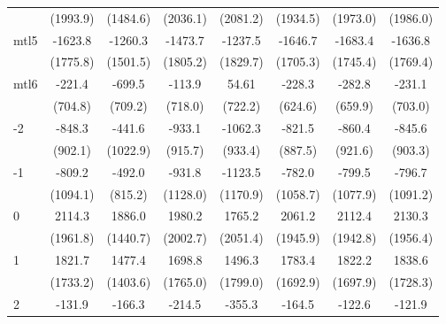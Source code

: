 \documentclass{article}
\begin{document}
{\begin{longtable}{l*{7}{c}}
                & (1993.9)         & (1484.6)         & (2036.1)         & (2081.2)         & (1934.5)         & (1973.0)         & (1986.0)         \\
mtl5            &  -1623.8         &  -1260.3         &  -1473.7         &  -1237.5         &  -1646.7         &  -1683.4         &  -1636.8         \\
                & (1775.8)         & (1501.5)         & (1805.2)         & (1829.7)         & (1705.3)         & (1745.4)         & (1769.4)         \\
mtl6            &   -221.4         &   -699.5         &   -113.9         &    54.61         &   -228.3         &   -282.8         &   -231.1         \\
                &  (704.8)         &  (709.2)         &  (718.0)         &  (722.2)         &  (624.6)         &  (659.9)         &  (703.0)         \\
-2              &   -848.3         &   -441.6         &   -933.1         &  -1062.3         &   -821.5         &   -860.4         &   -845.6         \\
                &  (902.1)         & (1022.9)         &  (915.7)         &  (933.4)         &  (887.5)         &  (921.6)         &  (903.3)         \\
-1              &   -809.2         &   -492.0         &   -931.8         &  -1123.5         &   -782.0         &   -799.5         &   -796.7         \\
                & (1094.1)         &  (815.2)         & (1128.0)         & (1170.9)         & (1058.7)         & (1077.9)         & (1091.2)         \\
0               &   2114.3         &   1886.0         &   1980.2         &   1765.2         &   2061.2         &   2112.4         &   2130.3         \\
                & (1961.8)         & (1440.7)         & (2002.7)         & (2051.4)         & (1945.9)         & (1942.8)         & (1956.4)         \\
1               &   1821.7         &   1477.4         &   1698.8         &   1496.3         &   1783.4         &   1822.2         &   1838.6         \\
                & (1733.2)         & (1403.6)         & (1765.0)         & (1799.0)         & (1692.9)         & (1697.9)         & (1728.3)         \\
2               &   -131.9         &   -166.3         &   -214.5         &   -355.3         &   -164.5         &   -122.6         &   -121.9         \\

\end{longtable}}
\end{document}
